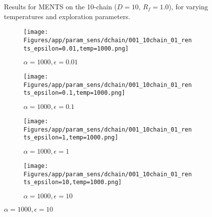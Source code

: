 \documentclass{article}
\theoremstyle{plain}
\begin{document}
\begin{appendices}
\begin{figure}
                \caption{Results for MENTS on the 10-chain ($D=10$, $R_f=1.0$), for varying temperatures and exploration parameters.}
                \label{fig:ments_10chain_hps}
            \end{figure}


            \begin{figure}
                \centering
                
                \begin{subfigure}[b]{0.24\textwidth}
                    \centering
                    \texttt{[image: Figures/app/param\_sens/dchain/001\_10chain\_01\_rents\_epsilon=0.01,temp=1000.png]}
                    \caption*{$\alpha=1000,\epsilon=0.01$}
                \end{subfigure}
                \begin{subfigure}[b]{0.24\textwidth}
                    \centering
                    \texttt{[image: Figures/app/param\_sens/dchain/001\_10chain\_01\_rents\_epsilon=0.1,temp=1000.png]}
                    \caption*{$\alpha=1000,\epsilon=0.1$}
                \end{subfigure}
                \begin{subfigure}[b]{0.24\textwidth}
                    \centering
                    \texttt{[image: Figures/app/param\_sens/dchain/001\_10chain\_01\_rents\_epsilon=1,temp=1000.png]}
                    \caption*{$\alpha=1000,\epsilon=1$}
                \end{subfigure}
                \begin{subfigure}[b]{0.24\textwidth}
                    \centering
                    \texttt{[image: Figures/app/param\_sens/dchain/001\_10chain\_01\_rents\_epsilon=10,temp=1000.png]}
                    \caption*{$\alpha=1000,\epsilon=10$}
                \end{subfigure}
                

\end{figure}
\end{appendices}
\end{document}
